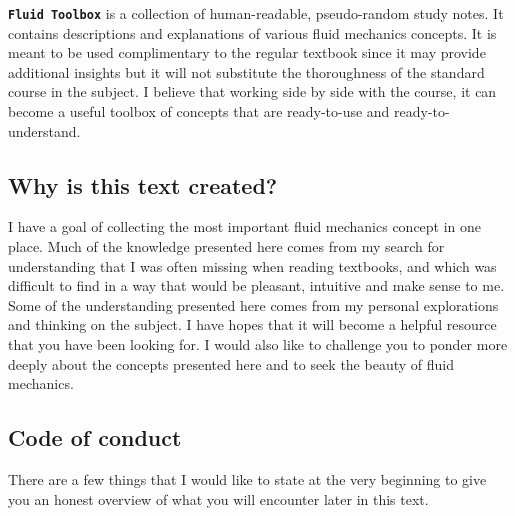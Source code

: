 \documentclass[10pt]{report}
\begin{document}


\texttt{\textbf{Fluid Toolbox}} is a collection of human-readable, pseudo-random study notes. It contains descriptions and explanations of various fluid mechanics concepts. It is meant to be used complimentary to the regular textbook since it may provide additional insights but it will not substitute the thoroughness of the standard course in the subject. I believe that working side by side with the course, it can become a useful toolbox of concepts that are ready-to-use and ready-to-understand.

\subsection*{Why is this text created?}

I have a goal of collecting the most important fluid mechanics concept in one place. Much of the knowledge presented here comes from my search for understanding that I was often missing when reading textbooks, and which was difficult to find in a way that would be pleasant, intuitive and make sense to me. Some of the understanding presented here comes from my personal explorations and thinking on the subject. I have hopes that it will become a helpful resource that you have been looking for. I would also like to challenge you to ponder more deeply about the concepts presented here and to seek the beauty of fluid mechanics.

\subsection*{Code of conduct}
\thispagestyle{empty}
There are a few things that I would like to state at the very beginning to give you an honest overview of what you will encounter later in this text.
\end{document}
